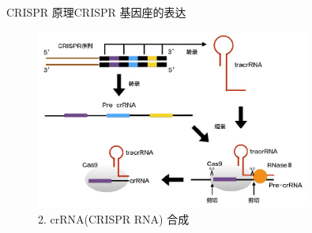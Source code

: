 \documentclass{beamer}
\begin{document}
\begin{frame}{CRISPR 原理}{CRISPR 基因座的表达}
		
	\begin{figure}
		\centering
		\includegraphics[width=0.8\textwidth]{img/infect_stage2.jpeg}
		\caption{2. crRNA(CRISPR RNA) 合成}
	\end{figure}








\end{frame}

\end{document}
